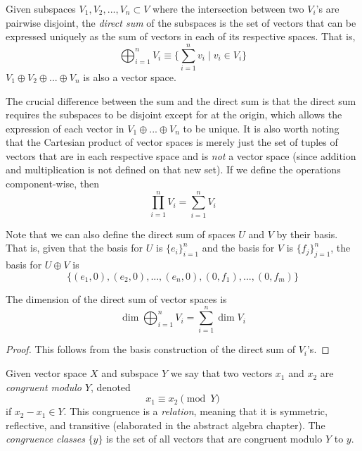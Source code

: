 \documentclass{article}
\begin{document}
    \begin{definition}
      Given subspaces $V_1, V_2, ..., V_n \subset V$ where the intersection between two $V_i$'s are pairwise disjoint, the \textit{direct sum} of the subspaces is the set of vectors that can be expressed uniquely as the sum of vectors in each of its respective spaces. That is, 
      \begin{equation}
        \bigoplus_{i=1}^n V_i \equiv \Big\{ \sum_{i=1}^n v_i \; | \; v_i \in V_i\Big\}
      \end{equation}
      $V_1 \oplus V_2 \oplus ... \oplus V_n$ is also a vector space. 
    \end{definition}

    The crucial difference between the sum and the direct sum is that the direct sum requires the subspaces to be disjoint except for at the origin, which allows the expression of each vector in $V_1 \oplus ... \oplus V_n$ to be unique. It is also worth noting that the Cartesian product of vector spaces is merely just the set of tuples of vectors that are in each respective space and is \textit{not} a vector space (since addition and multiplication is not defined on that new set). If we define the operations component-wise, then 
    \begin{equation}
      \prod_{i=1}^n V_i = \sum_{i=1}^n V_i
    \end{equation}

    Note that we can also define the direct sum of spaces $U$ and $V$ by their basis. That is, given that the basis for $U$ is $\{e_i\}_{i=1}^n$ and the basis for $V$ is $\{f_j\}_{j=1}^n$, the basis for $U \oplus V$ is
    \begin{equation}
      \{(e_1, 0), (e_2, 0), ..., (e_n, 0), (0, f_1), ..., (0, f_m)\}
    \end{equation}

    \begin{proposition}
      The dimension of the direct sum of vector spaces is 
      \begin{equation}
        \dim{\bigoplus_{i=1}^n V_i} = \sum_{i=1}^n \dim{V_i}
      \end{equation}
    \end{proposition}
    \begin{proof}
      This follows from the basis construction of the direct sum of $V_i$'s. 
    \end{proof}

    \begin{definition}
      Given vector space $X$ and subspace $Y$ we say that two vectors $x_1$ and $x_2$ are \textit{congruent modulo $Y$}, denoted 
      \begin{equation}
        x_1 \equiv x_2 \pmod{Y}
      \end{equation}
      if $x_2 - x_1 \in Y$. This congruence is a \textit{relation}, meaning that it is symmetric, reflective, and transitive (elaborated in the abstract algebra chapter). The \textit{congruence classes} $\{ y\}$ is the set of all vectors that are congruent modulo $Y$ to $y$. 
    \end{definition}
\end{document}
